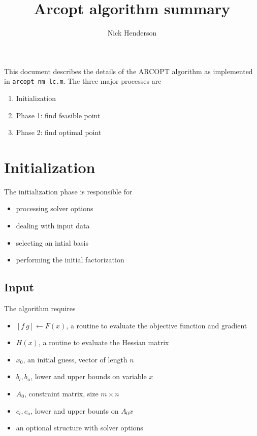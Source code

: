 \documentclass[11pt]{article}
\title{Arcopt algorithm summary}
\author{Nick Henderson}
\newcommand{\code}[1]{\texttt{#1}}
\begin{document}
\maketitle

This document describes the details of the ARCOPT algorithm as implemented in
\code{arcopt\_nm\_lc.m}.  The three major processes are

\begin{enumerate}
\item Initialization
\item Phase 1: find feasible point
\item Phase 2: find optimal point
\end{enumerate}

\section{Initialization}

The initialization phase is responsible for

\begin{itemize}
\item processing solver options
\item dealing with input data
\item selecting an intial basis
\item performing the initial factorization
\end{itemize}

\subsection{Input}

The algorithm requires

\begin{itemize}
\item $[f\ g] \leftarrow F(x)$, a routine to evaluate the objective function
  and gradient
\item $H(x)$, a routine to evaluate the Hessian matrix
\item $x_0$, an initial guess, vector of length $n$
\item $b_l, b_u$, lower and upper bounds on variable $x$
\item $A_0$, constraint matrix, size $m\times n$
\item $c_l, c_u$, lower and upper bounts on $A_0x$
\item an optional structure with solver options
\end{itemize}
\end{document}
